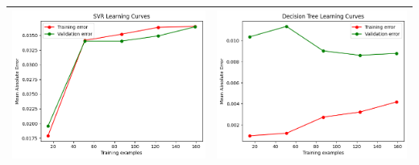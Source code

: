 \begin{table}[H]
    \centering
    \footnotesize
    \setlength\tabcolsep{0pt}
    \begin{tabularx}{\textwidth}{|X|X|}
        \hline
        \includegraphics[width=\linewidth, trim=0 0 0 0]{images/SVR_lc70_ridotto.png} &
        \includegraphics[width=\linewidth, trim=0 0 0 0]{images/DecisionTree_lc70_ridotto.png} \\
        \hline

\end{tabularx}
\end{table}
